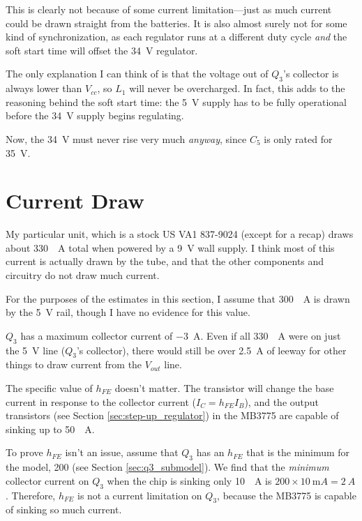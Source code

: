 \documentclass{article}
\newcommand{\Vcc}{$V_{cc}$}
\newcommand{\Vout}{$V_{out}$}
\newcommand{\model}{\textsf}
\begin{document}
This is clearly not because of some current limitation---just as much
current could be drawn straight from the batteries. It is also almost
surely not for some kind of synchronization, as each regulator runs at
a different duty cycle \textit{and} the soft start time will offset
the \qty{34}{\volt} regulator.

The only explanation I can think of is that the voltage out of $Q_3$'s
collector is always lower than \Vcc{}, so $L_1$ will never be
overcharged. In fact, this adds to the reasoning behind the soft start
time: the \qty{5}{\volt} supply has to be fully operational before the
\qty{34}{\volt} supply begins regulating.

Now, the \qty{34}{\volt} must never rise very much \textit{anyway},
since $C_5$ is only rated for \qty{35}{\volt}.

\section{Current Draw}
\label{sec:current_draw}
My particular unit, which is a stock \model{US VA1 837-9024} (except
for a recap) draws about \qty{330}{\milli{}A} total when powered by a
\qty{9}{\volt} wall supply. I think most of this current is actually
drawn by the tube, and that the other components and circuitry do not
draw much current.

For the purposes of the estimates in this section, I assume that
\qty{300}{\milli{}A} is drawn by the \qty{5}{\volt} rail, though I
have no evidence for this value.

$Q_3$ has a maximum collector current of \qty{-3}{A}. Even if all
\qty{330}{\milli{}A} were on just the \qty{5}{\volt} line ($Q_3$'s
collector), there would still be over \qty{2.5}{A} of leeway for other
things to draw current from the \Vout{} line.

The specific value of $h_{FE}$ doesn't matter. The transistor will
change the base current in response to the collector current
($I_C=h_{FE}I_B$), and the output transistors (see Section
\ref{sec:step-up_regulator}) in the \model{MB3775} are capable of
sinking up to \qty{50}{\milli{}A}.

To prove $h_{FE}$ isn't an issue, assume that $Q_3$ has an $h_{FE}$
that is the minimum for the model, 200 (see Section
\ref{sec:q3_submodel}).  We find that the \textit{minimum} collector
current on $Q_3$ when the chip is sinking only \qty{10}{\milli{}A} is
$200\times{}\qty{10}{\milli{}A}=\qty{2}{A}$. Therefore, $h_{FE}$ is
not a current limitation on $Q_3$, because the \model{MB3775} is
capable of sinking so much current.
\end{document}
